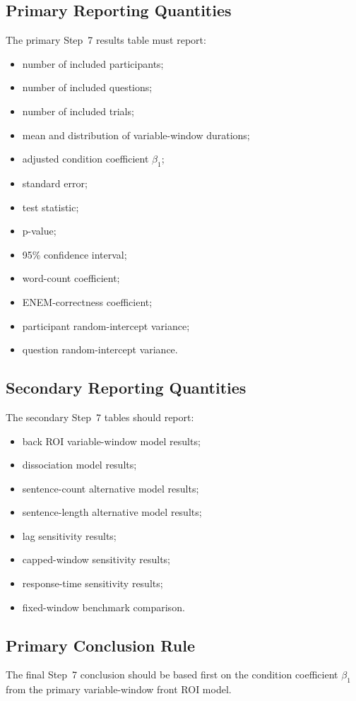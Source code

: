 \documentclass[11pt]{article}
\begin{document}
\subsection{Primary Reporting Quantities}
The primary Step~7 results table must report:
\begin{itemize}
    \item number of included participants;
    \item number of included questions;
    \item number of included trials;
    \item mean and distribution of variable-window durations;
    \item adjusted condition coefficient \(\beta_1\);
    \item standard error;
    \item test statistic;
    \item p-value;
    \item 95\% confidence interval;
    \item word-count coefficient;
    \item ENEM-correctness coefficient;
    \item participant random-intercept variance;
    \item question random-intercept variance.
\end{itemize}

\subsection{Secondary Reporting Quantities}
The secondary Step~7 tables should report:
\begin{itemize}
    \item back ROI variable-window model results;
    \item dissociation model results;
    \item sentence-count alternative model results;
    \item sentence-length alternative model results;
    \item lag sensitivity results;
    \item capped-window sensitivity results;
    \item response-time sensitivity results;
    \item fixed-window benchmark comparison.
\end{itemize}

\subsection{Primary Conclusion Rule}
The final Step~7 conclusion should be based first on the condition coefficient \(\beta_1\)
from the primary variable-window front ROI model.
\end{document}
